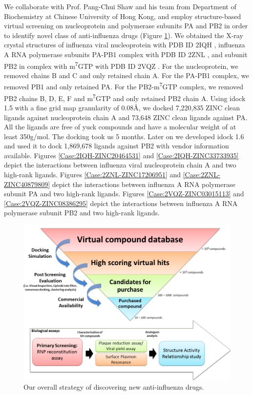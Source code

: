 We collaborate with Prof. Pang-Chui Shaw and his team from Department of Biochemistry at Chinese University of Hong Kong, and employ structure-based virtual screening on nucleoprotein and polymerase subunits PA and PB2 in order to identify novel class of anti-influenza drugs (Figure \ref{Case:InfluenzaProjectFlow}). We obtained the X-ray crystal structures of influenza viral nucleoprotein with PDB ID 2IQH \citep{1140}, influenza A RNA polymerase subunits PA-PB1 complex with PDB ID 2ZNL \citep{1141}, and subunit PB2 in complex with m\textsuperscript{7}GTP with PDB ID 2VQZ \citep{1192}. For the nucleoprotein, we removed chains B and C and only retained chain A. For the PA-PB1 complex, we removed PB1 and only retained PA. For the PB2-m\textsuperscript{7}GTP complex, we removed PB2 chains B, D, E, F and m\textsuperscript{7}GTP and only retained PB2 chain A. Using idock 1.5 with a fine grid map granularity of 0.08\AA, we docked 7,220,835 ZINC \citep{532} clean ligands against nucleoprotein chain A and 73,648 ZINC clean ligands against PA. All the ligands are free of yuck compounds and have a molecular weight of at least 350g/mol. The docking took us 5 months. Later on we developed idock 1.6 and used it to dock 1,869,678 ligands against PB2 with vendor information available. Figures \ref{Case:2IQH-ZINC20464531} and \ref{Case:2IQH-ZINC33733935} depict the interactions between influenza viral nucleoprotein chain A and two high-rank ligands. Figures \ref{Case:2ZNL-ZINC17206951} and \ref{Case:2ZNL-ZINC40879809} depict the interactions between influenza A RNA polymerase subunit PA and two high-rank ligands. Figures \ref{Case:2VQZ-ZINC03015113} and \ref{Case:2VQZ-ZINC08386295} depict the interactions between influenza A RNA polymerase subunit PB2 and two high-rank ligands.

\begin{figure}[t]
\centering
\includegraphics[width=\linewidth]{Case/InfluenzaProjectFlow.png}
\caption{Our overall strategy of discovering new anti-influenza drugs.}
\label{Case:InfluenzaProjectFlow}
\end{figure}

